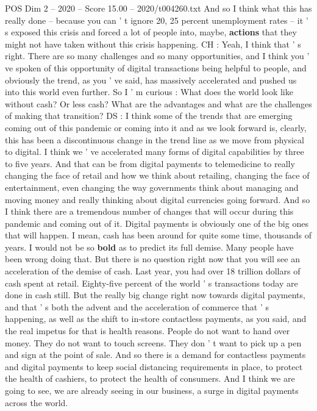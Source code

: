 \begin{textsample}{POS Dim 2 – 2020 – Score 15.00 – 2020/t004260.txt}
And so I think what this has really done -- because you can ' t ignore 20, 25 percent unemployment rates -- it ' s exposed this crisis and forced a lot of people into, maybe, \textbf{actions} that they might not have taken without this crisis happening.
CH : Yeah, I think that ' s right.
There are so many challenges and so many opportunities, and I think you ' ve spoken of this opportunity of digital transactions being helpful to people, and obviously the trend, as you ' ve said, has massively accelerated and pushed us into this world even further.
So I ' m curious : What does the world look like without cash?
Or less cash?
What are the advantages and what are the challenges of making that transition?
DS : I think some of the trends that are emerging coming out of this pandemic or coming into it and as we look forward is, clearly, this has been a discontinuous change in the trend line as we move from physical to digital.
I think we ' ve accelerated many forms of digital capabilities by three to five years.
And that can be from digital payments to telemedicine to really changing the face of retail and how we think about retailing, changing the face of entertainment, even changing the way governments think about managing and moving money and really thinking about digital currencies going forward.
And so I think there are a tremendous number of changes that will occur during this pandemic and coming out of it.
Digital payments is obviously one of the big ones that will happen.
I mean, cash has been around for quite some time, thousands of years.
I would not be so \textbf{bold} as to predict its full demise.
Many people have been wrong doing that.
But there is no question right now that you will see an acceleration of the demise of cash.
Last year, you had over 18 trillion dollars of cash spent at retail.
Eighty-five percent of the world ' s transactions today are done in cash still.
But the really big change right now towards digital payments, and that ' s both the advent and the acceleration of commerce that ' s happening, as well as the shift to in-store contactless payments, as you said, and the real impetus for that is health reasons.
People do not want to hand over money.
They do not want to touch screens.
They don ' t want to pick up a pen and sign at the point of sale.
And so there is a demand for contactless payments and digital payments to keep social distancing requirements in place, to protect the health of cashiers, to protect the health of consumers.
And I think we are going to see, we are already seeing in our business, a surge in digital payments across the world.

\end{textsample}
